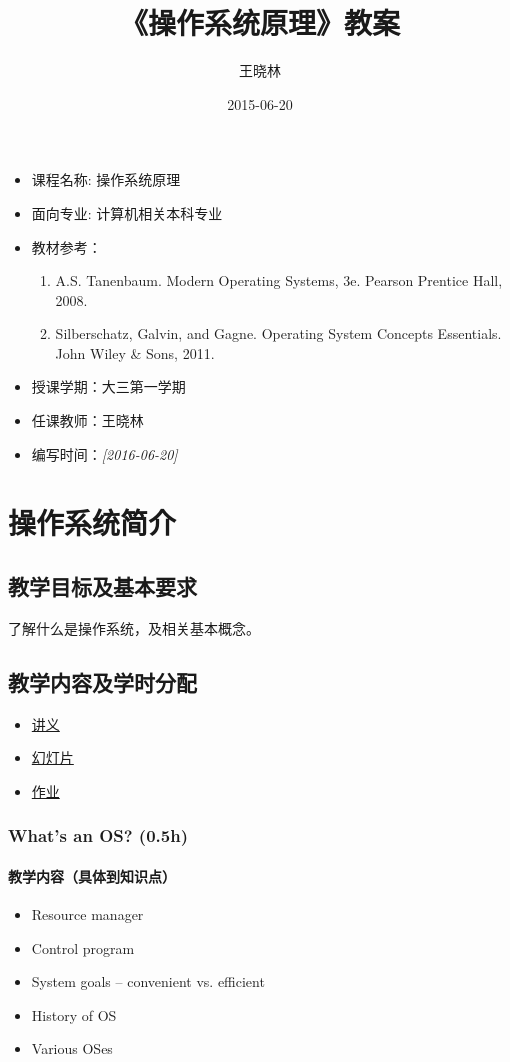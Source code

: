 \documentclass[11pt]{article}
\author{王晓林}
\date{2015-06-20}
\title{《操作系统原理》教案}
\begin{document}
\maketitle
\tableofcontents


\clearpage
\begin{itemize}
\item 课程名称: 操作系统原理
\item 面向专业: 计算机相关本科专业
\item 教材参考：
\begin{enumerate}
\item A.S. Tanenbaum. Modern Operating Systems, 3e. Pearson Prentice Hall, 2008.
\item Silberschatz, Galvin, and Gagne. Operating System Concepts Essentials. John Wiley \& Sons, 2011.
\end{enumerate}
\item 授课学期：大三第一学期
\item 任课教师：王晓林
\item 编写时间：\textit{[2016-06-20]}
\end{itemize}
\section{操作系统简介}
\label{sec-1}
\subsection{教学目标及基本要求}
\label{sec-1-1}
了解什么是操作系统，及相关基本概念。
\subsection{教学内容及学时分配}
\label{sec-1-2}
\begin{itemize}
\item \href{./slides/intro-a.pdf}{讲义}
\item \href{./slides/intro-b.pdf}{幻灯片}
\item \href{./lab.html#sec-3}{作业}
\end{itemize}
\subsubsection{What's an OS? (0.5h)}
\label{sec-1-2-1}
\paragraph{教学内容（具体到知识点）}
\label{sec-1-2-1-1}
\begin{itemize}
\item Resource manager
\item Control program
\item System goals -- convenient vs. efficient
\item History of OS
\item Various OSes
\end{itemize}
\end{document}
